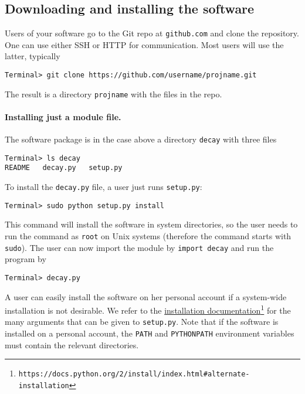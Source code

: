 \documentclass[graybox,sectrefs,envcountresetchap,open=right,final]{svmonodo}
\begin{document}
\subsection{Downloading and installing the software}

Users of your software go to the Git repo at \texttt{github.com} and
clone the repository. One can use either SSH or HTTP for communication.
Most users will use the latter, typically

\begin{Verbatim}[frame=lines,label=\fbox{{\tiny Terminal}},framesep=2.5mm,framerule=0.7pt,fontsize=\fontsize{9pt}{9pt}]
Terminal> git clone https://github.com/username/projname.git
\end{Verbatim}
The result is a directory \texttt{projname} with the files in the repo.

\paragraph{Installing just a module file.}
The software package is in the case above a directory \texttt{decay} with three files

\begin{Verbatim}[frame=lines,label=\fbox{{\tiny Terminal}},framesep=2.5mm,framerule=0.7pt,fontsize=\fontsize{9pt}{9pt}]
Terminal> ls decay
README   decay.py   setup.py
\end{Verbatim}
To install the \texttt{decay.py} file, a user
just runs \texttt{setup.py}:

\begin{Verbatim}[frame=lines,label=\fbox{{\tiny Terminal}},framesep=2.5mm,framerule=0.7pt,fontsize=\fontsize{9pt}{9pt}]
Terminal> sudo python setup.py install
\end{Verbatim}
This command will install the software in system directories, so the user
needs to run the command as \texttt{root} on Unix systems (therefore the command
starts with \texttt{sudo}).
The user can now import the module by \texttt{import decay} and run
the program by

\begin{Verbatim}[frame=lines,label=\fbox{{\tiny Terminal}},framesep=2.5mm,framerule=0.7pt,fontsize=\fontsize{9pt}{9pt}]
Terminal> decay.py
\end{Verbatim}

A user can easily install the software on her personal account if
a system-wide installation is not desirable. We refer to the
\href{{https://docs.python.org/2/install/index.html#alternate-installation}}{installation documentation}\footnote{\texttt{https://docs.python.org/2/install/index.html\#alternate-installation}} for the many arguments that can be given to \texttt{setup.py}.
Note that if the software is installed on a personal account, the
\texttt{PATH} and \texttt{PYTHONPATH} environment variables must contain the
relevant directories.
\end{document}
